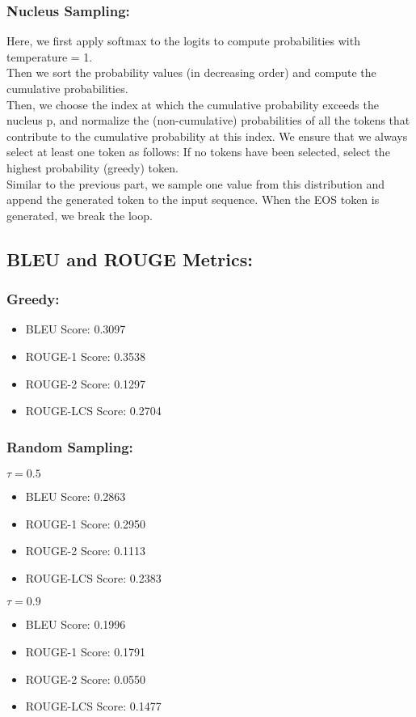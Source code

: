 \documentclass{article}
\begin{document}
\subsubsection{Nucleus Sampling:}
Here, we first apply softmax to the logits to compute probabilities with temperature = 1. \\
Then we sort the probability values (in decreasing order) and compute the cumulative probabilities. \\
Then, we choose the index at which the cumulative probability exceeds the nucleus p, and normalize the (non-cumulative) probabilities of all the tokens that contribute to the cumulative probability at this index. We ensure that we always select at least one token as follows: If no tokens have been selected, select the highest probability (greedy) token. \\
Similar to the previous part, we sample one value from this distribution and append the generated token to the input sequence. When the EOS token is generated, we break the loop.

\subsection{BLEU and ROUGE Metrics:}
\subsubsection{Greedy:}
\begin{itemize}
    \item BLEU Score: 0.3097
    \item ROUGE-1 Score: 0.3538
    \item ROUGE-2 Score: 0.1297
    \item ROUGE-LCS Score: 0.2704
\end{itemize}

\subsubsection{Random Sampling:}
$\tau = 0.5$
\begin{itemize}
    \item BLEU Score: 0.2863
    \item ROUGE-1 Score: 0.2950
    \item ROUGE-2 Score: 0.1113
    \item ROUGE-LCS Score: 0.2383
\end{itemize}
$\tau = 0.9$
\begin{itemize}
    \item BLEU Score: 0.1996
    \item ROUGE-1 Score: 0.1791
    \item ROUGE-2 Score: 0.0550
    \item ROUGE-LCS Score: 0.1477
\end{itemize}
\end{document}
